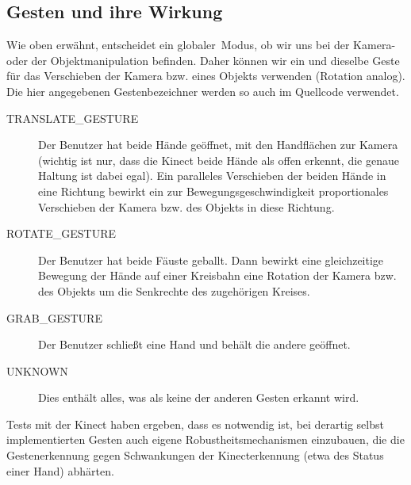 \documentclass[12pt,a4paper]{article}
\begin{document}
	\subsection{Gesten und ihre Wirkung}
	Wie oben erwähnt, entscheidet ein \glqq globaler\grqq\ Modus, ob wir uns bei der Kamera- oder der Objektmanipulation befinden. Daher können wir ein und dieselbe Geste für das Verschieben der Kamera bzw. eines Objekts verwenden (Rotation analog). Die hier angegebenen Gestenbezeichner werden so auch im Quellcode verwendet.
	\begin{description}
		\item[TRANSLATE\_GESTURE] Der Benutzer hat beide Hände geöffnet, mit den Handflächen zur Kamera (wichtig ist nur, dass die Kinect beide Hände als offen erkennt, die genaue Haltung ist dabei egal). Ein paralleles Verschieben der beiden Hände in eine Richtung bewirkt ein zur Bewegungsgeschwindigkeit proportionales Verschieben der Kamera bzw. des Objekts in diese Richtung.
		\item[ROTATE\_GESTURE] Der Benutzer hat beide Fäuste geballt. Dann bewirkt eine gleichzeitige Bewegung der Hände auf einer Kreisbahn eine Rotation der Kamera bzw. des Objekts um die Senkrechte des zugehörigen Kreises.
		\item[GRAB\_GESTURE] Der Benutzer schließt eine Hand und behält die andere geöffnet.
		\item[UNKNOWN] Dies enthält alles, was als keine der anderen Gesten erkannt wird.
	\end{description}
	Tests mit der Kinect haben ergeben, dass es notwendig ist, bei derartig selbst implementierten Gesten auch eigene Robustheitsmechanismen einzubauen, die die Gestenerkennung gegen Schwankungen der Kinecterkennung (etwa des Status einer Hand) abhärten.
\end{document}
